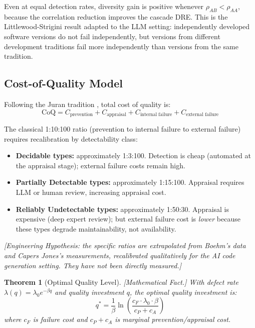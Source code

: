 \documentclass[11pt, a4paper, copyright]{googledeepmind}
\newtheorem{theorem}{Theorem}[section]
\begin{document}
Even at equal detection rates, diversity gain is positive whenever $\rho_{AB} < \rho_{AA}$, because the correlation reduction improves the cascade DRE. This is the Littlewood-Strigini result \citep{littlewood1993, littlewood2000} adapted to the LLM setting: independently developed software versions do not fail independently, but versions from different development traditions fail more independently than versions from the same tradition.

\subsection{Cost-of-Quality Model}

Following the Juran tradition \citep{juran1999}, total cost of quality is:
\begin{equation}
    \text{CoQ} = C_{\text{prevention}} + C_{\text{appraisal}} + C_{\text{internal failure}} + C_{\text{external failure}}
\end{equation}

The classical 1:10:100 ratio (prevention to internal failure to external failure) \citep{boehm1981} requires recalibration by detectability class:

\begin{itemize}[nosep]
\item \textbf{Decidable types:} approximately 1:3:100. Detection is cheap (automated at the appraisal stage); external failure costs remain high.
\item \textbf{Partially Detectable types:} approximately 1:15:100. Appraisal requires LLM or human review, increasing appraisal cost.
\item \textbf{Reliably Undetectable types:} approximately 1:50:30. Appraisal is expensive (deep expert review); but external failure cost is \emph{lower} because these types degrade maintainability, not availability.
\end{itemize}

\emph{[Engineering Hypothesis: the specific ratios are extrapolated from Boehm's data and Capers Jones's measurements, recalibrated qualitatively for the AI code generation setting. They have not been directly measured.]}

\begin{theorem}[Optimal Quality Level]
\label{thm:optquality}
\emph{[Mathematical Fact.]} With defect rate $\lambda(q) = \lambda_0 e^{-\beta q}$ and quality investment $q$, the optimal quality investment is:
\begin{equation}
q^* = \frac{1}{\beta} \ln\!\left(\frac{c_F \cdot \lambda_0 \cdot \beta}{c_P + c_A}\right)
\end{equation}
where $c_F$ is failure cost and $c_P + c_A$ is marginal prevention/appraisal cost.
\end{theorem}
\end{document}
